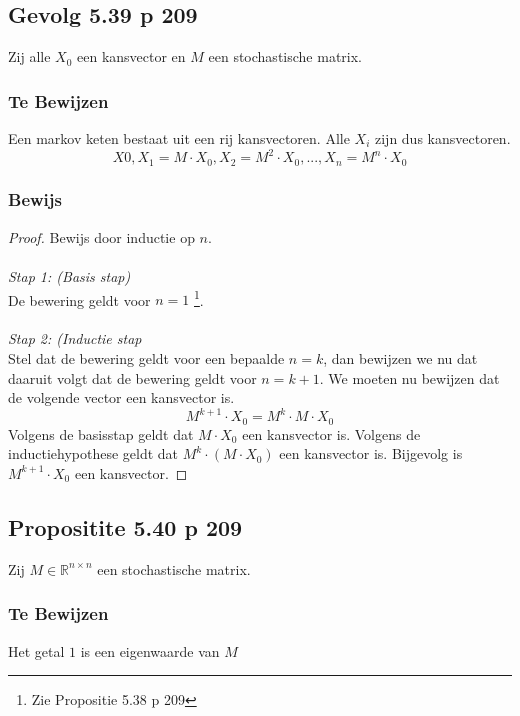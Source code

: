 \documentclass[lineaire_algebra_oplossingen.tex]{subfiles}
\begin{document}
\subsection{Gevolg 5.39 p 209}
\label{5.39}
Zij alle $X_0$ een kansvector en $M$ een stochastische matrix.

\subsubsection*{Te Bewijzen}
Een markov keten bestaat uit een rij kansvectoren. Alle $X_i$ zijn dus kansvectoren.
\[
X0, X_1 = M\cdot X_0, X_2 = M^2\cdot X_0,...,X_n = M^n\cdot X_0
\]

\subsubsection*{Bewijs}
\begin{proof}
Bewijs door inductie op $n$.\\\\
\emph{Stap 1: (Basis stap)}\\
De bewering geldt voor $n=1$ \footnote{Zie Propositie 5.38 p 209}.\\\\
\emph{Stap 2: (Inductie stap}\\
Stel dat de bewering geldt voor een bepaalde $n=k$, dan bewijzen we nu dat daaruit volgt dat de bewering geldt voor $n=k+1$.
We moeten nu bewijzen dat de volgende vector een kansvector is.
\[
M^{k+1}\cdot X_0 = M^{k}\cdot M\cdot X_0
\]
Volgens de basisstap geldt dat $M\cdot X_0$ een kansvector is. Volgens de inductiehypothese geldt dat $M^{k}\cdot (M\cdot X_0)$ een kansvector is. Bijgevolg is $M^{k+1}\cdot X_0$ een kansvector.
\end{proof}


\subsection{Propositite 5.40 p 209}
\label{5.40}
Zij $M\in \mathbb{R}^{n\times n}$ een stochastische matrix.

\subsubsection*{Te Bewijzen}
Het getal $1$ is een eigenwaarde van $M$
\end{document}

